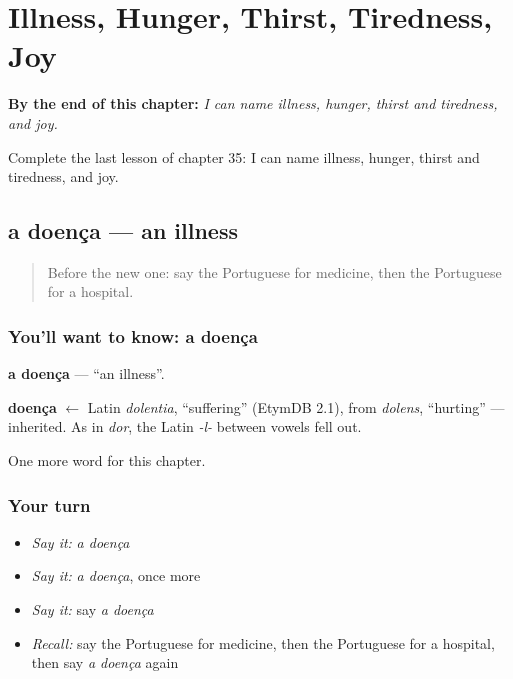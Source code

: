 
\chapter{Illness, Hunger, Thirst, Tiredness, Joy}
\label{ch:pt-illness-hunger-thirst-tiredness-joy}

\begin{chapteropening}
\textbf{By the end of this chapter:} \emph{I can name illness, hunger, thirst and tiredness, and joy.}

Complete the last lesson of chapter 35: I can name illness, hunger, thirst and tiredness, and joy.
\end{chapteropening}

\section[a doença]{a doença — an illness}

\label{lesson:PT-C35-doenca}



\begin{quote}
Before the new one: say the Portuguese for medicine, then the Portuguese for a hospital.
\end{quote}

\subsection*{You'll want to know: a doença}
\textbf{a doença} — \textquotedblleft{}an illness\textquotedblright{}.

\begin{cousinweb}
\textbf{doença} $\leftarrow$ Latin \emph{dolentia}, \textquotedblleft{}suffering\textquotedblright{} (EtymDB 2.1), from \emph{dolens}, \textquotedblleft{}hurting\textquotedblright{} — inherited. As in \emph{dor}, the Latin \emph{-l-} between vowels fell out.
\end{cousinweb}

\begin{grammarlens}[title={What you've built}]
One more word for this chapter.
\end{grammarlens}

\subsection*{Your turn}
\begin{itemize}
\raggedright
  \item \emph{Say it:} \emph{a doença}
  \item \emph{Say it:} \emph{a doença}, once more
  \item \emph{Say it:} say \emph{a doença}
  \item \emph{Recall:} say the Portuguese for medicine, then the Portuguese for a hospital, then say \emph{a doença} again
\end{itemize}

